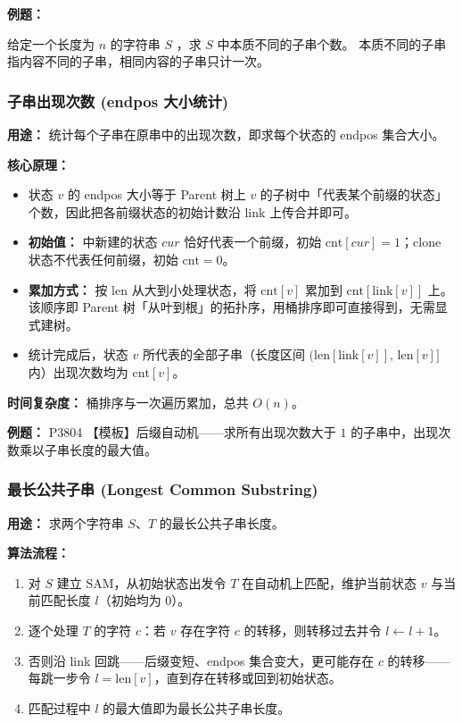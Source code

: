 \textbf{例题：}

给定一个长度为 $n$ 的字符串 $S$ ，求 $S$ 中本质不同的子串个数。
本质不同的子串指内容不同的子串，相同内容的子串只计一次。



\subsubsection{子串出现次数 (endpos 大小统计)}

\textbf{用途：} 统计每个子串在原串中的出现次数，即求每个状态的 endpos 集合大小。

\textbf{核心原理：}
\begin{itemize}
  \item 状态 $v$ 的 endpos 大小等于 Parent 树上 $v$ 的子树中「代表某个前缀的状态」个数，因此把各前缀状态的初始计数沿 link 上传合并即可。
  \item \textbf{初始值：}  中新建的状态 $cur$ 恰好代表一个前缀，初始 $\text{cnt}[cur] = 1$；clone 状态不代表任何前缀，初始 $\text{cnt} = 0$。
  \item \textbf{累加方式：} 按 len 从大到小处理状态，将 $\text{cnt}[v]$ 累加到 $\text{cnt}[\text{link}[v]]$ 上。该顺序即 Parent 树「从叶到根」的拓扑序，用桶排序即可直接得到，无需显式建树。
  \item 统计完成后，状态 $v$ 所代表的全部子串（长度区间 $(\text{len}[\text{link}[v]],\, \text{len}[v]]$ 内）出现次数均为 $\text{cnt}[v]$。
\end{itemize}

\textbf{时间复杂度：} 桶排序与一次遍历累加，总共 $O(n)$。

\textbf{例题：} P3804 【模板】后缀自动机——求所有出现次数大于 $1$ 的子串中，出现次数乘以子串长度的最大值。



\subsubsection{最长公共子串 (Longest Common Substring)}

\textbf{用途：} 求两个字符串 $S$、$T$ 的最长公共子串长度。

\textbf{算法流程：}
\begin{enumerate}
  \item 对 $S$ 建立 SAM，从初始状态出发令 $T$ 在自动机上匹配，维护当前状态 $v$ 与当前匹配长度 $l$（初始均为 $0$）。
  \item 逐个处理 $T$ 的字符 $c$：若 $v$ 存在字符 $c$ 的转移，则转移过去并令 $l \leftarrow l + 1$。
  \item 否则沿 link 回跳——后缀变短、endpos 集合变大，更可能存在 $c$ 的转移——每跳一步令 $l = \text{len}[v]$，直到存在转移或回到初始状态。
  \item 匹配过程中 $l$ 的最大值即为最长公共子串长度。
\end{enumerate}

